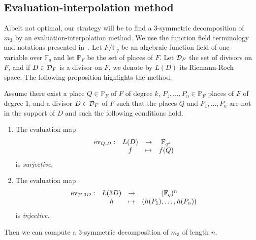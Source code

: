\documentclass[11pt]{article}
\begin{document}
\subsection{Evaluation-interpolation method}
\label{sec:eval}

Albeit not optimal, our strategy will be to find a $3$-symmetric decomposition of
$m_3$ by an evaluation-interpolation method. We use the function field
terminology and notations
presented in~\cite{Stichtenoth09}. Let $F/\mathbb{F}_q$ be an algebraic
function field of one variable over $\mathbb{F}_{q}$ and let $\mathbb{P}_F$ be the
set of places of $F$. Let $\mathcal{D}_F$ the set of
divisors on $F$, and if $D\in\mathcal{D}_F$ is a divisor on
$F$, we denote by $L(D)$ its Riemann-Roch space. The following proposition
highlights the method.

\begin{prop}
  \label{prop:method}
  Assume there exist a place $Q\in\mathbb{P}_{F}$ of $F$ of degree $k$, $P_1,
  \dots, P_n\in\mathbb{P}_F$ places of $F$ of degree $1$, and a divisor
  $D\in\mathcal{D}_F$ of $F$ such that the places $Q$ and $P_1, \dots, P_n$ are not in
  the support of $D$ and such the following conditions hold.
  \begin{enumerate}
    \item \label{cond:1} The evaluation map
      \[
        \begin{array}{cccc}
        \operatorname{ev}_{Q, D}: & L(D) & \to & \mathbb{F}_{q^k}\\
  & f & \mapsto & f(Q)
\end{array}
\]
is \emph{surjective}.
    \item \label{cond:2} The evaluation map
      \[
        \begin{array}{cccc}
        \operatorname{ev}_{\mathcal{P}, 3D}: & L(3D) & \to & (\mathbb{F}_{q})^n\\
  & h & \mapsto & (h(P_1), \dots, h(P_n))
\end{array}
\]
is \emph{injective}.
  \end{enumerate}
  Then we can compute a $3$-symmetric decomposition of $m_3$ of length $n$.
\end{prop}
\end{document}
